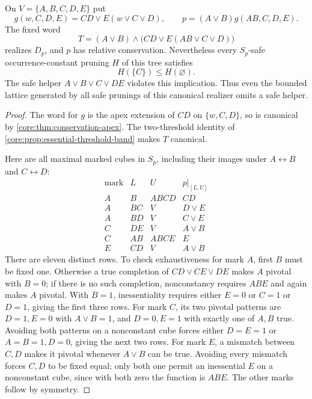 \begin{proposition}
\label{core:prop:conservation-without-prunings}
On $V=\{A,B,C,D,E\}$ put
\[
 g(w,C,D,E)=CD\vee E(w\vee C\vee D),\qquad
 p=(A\vee B)g(AB,C,D,E).
\]
The fixed word
\[
 T=(A\vee B)\wedge\bigl(CD\vee E(AB\vee C\vee D)\bigr)
\]
realizes $D_p$, and $p$ has relative conservation. Nevertheless every
$S_p$-safe occurrence-constant pruning $H$ of this tree satisfies
\[
 H(\{C\})\leq H(\varnothing).
\]
The safe helper $A\vee B\vee C\vee DE$ violates this implication.
Thus even the bounded lattice generated by all safe prunings of this
canonical realizer omits a safe helper.
\end{proposition}
\begin{proof}
The word for $g$ is the apex extension of $CD$ on $\{w,C,D\}$, so is
canonical by \cref{core:thm:conservation-apex}. The two-threshold identity
of \cref{core:prop:essential-threshold-band} makes $T$ canonical.

Here are all maximal marked cubes in $S_p$, including their images under
$A\leftrightarrow B$ and $C\leftrightarrow D$:
\[
\begin{array}{c|c|c|c}
 \text{mark}&L&U&p|_{[L,U]}\\\hline
 A&B&ABCD&CD\\
 A&BC&V&D\vee E\\
 A&BD&V&C\vee E\\
 C&DE&V&A\vee B\\
 C&AB&ABCE&E\\
 E&CD&V&A\vee B
\end{array}
\]
There are eleven distinct rows. To check exhaustiveness for mark $A$,
first $B$ must be fixed one. Otherwise a true completion of
$CD\vee CE\vee DE$ makes $A$ pivotal with $B=0$; if there is no such
completion, nonconstancy requires $ABE$ and again makes $A$ pivotal.
With $B=1$, inessentiality requires either $E=0$ or $C=1$ or $D=1$,
giving the first three rows. For mark $C$, its two pivotal patterns are
$D=1,E=0$ with $A\vee B=1$, and $D=0,E=1$ with exactly one of $A,B$
true. Avoiding both patterns on a nonconstant cube forces either
$D=E=1$ or $A=B=1,D=0$, giving the next two rows. For mark $E$, a
mismatch between $C,D$ makes it pivotal whenever $A\vee B$ can be true.
Avoiding every mismatch forces $C,D$ to be fixed equal; only both one
permit an inessential $E$ on a nonconstant cube, since with both zero
the function is $ABE$. The other marks follow by symmetry.


\end{proof}
